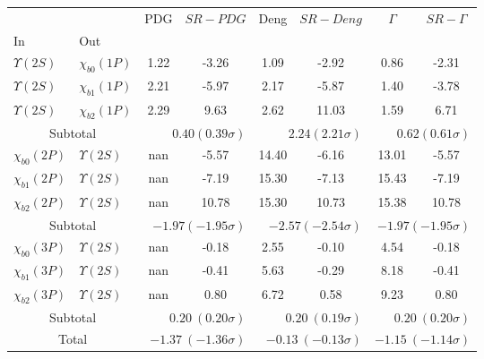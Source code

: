 \begin{tabular}{|l|l|c|c|c|c|c|c|}%
\hline%
&&PDG&$SR-PDG$&Deng&$SR-Deng$&$\Gamma$&$SR-\Gamma$\\%
In&Out&&&&&&\\%
\hline%
$\Upsilon(2S)$&$\chi_{b0}(1P)$&1.22&-3.26&1.09&-2.92&0.86&-2.31\\%
$\Upsilon(2S)$&$\chi_{b1}(1P)$&2.21&-5.97&2.17&-5.87&1.40&-3.78\\%
$\Upsilon(2S)$&$\chi_{b2}(1P)$&2.29&9.63&2.62&11.03&1.59&6.71\\%
\hline%
\hline%
\multicolumn{2}{|c|}{Subtotal}&\multicolumn{2}{|r|}{$0.40 (0.39\sigma)$}&\multicolumn{2}{|r|}{$2.24 (2.21\sigma)$}&\multicolumn{2}{|r|}{$0.62 (0.61\sigma)$}\\%
\hline%
\hline%
$\chi_{b0}(2P)$&$\Upsilon(2S)$&nan&-5.57&14.40&-6.16&13.01&-5.57\\%
$\chi_{b1}(2P)$&$\Upsilon(2S)$&nan&-7.19&15.30&-7.13&15.43&-7.19\\%
$\chi_{b2}(2P)$&$\Upsilon(2S)$&nan&10.78&15.30&10.73&15.38&10.78\\%
\hline%
\hline%
\multicolumn{2}{|c|}{Subtotal}&\multicolumn{2}{|r|}{$-1.97 (-1.95\sigma)$}&\multicolumn{2}{|r|}{$-2.57 (-2.54\sigma)$}&\multicolumn{2}{|r|}{$-1.97 (-1.95\sigma)$}\\%
\hline%
\hline%
$\chi_{b0}(3P)$&$\Upsilon(2S)$&nan&-0.18&2.55&-0.10&4.54&-0.18\\%
$\chi_{b1}(3P)$&$\Upsilon(2S)$&nan&-0.41&5.63&-0.29&8.18&-0.41\\%
$\chi_{b2}(3P)$&$\Upsilon(2S)$&nan&0.80&6.72&0.58&9.23&0.80\\%
\hline%
\hline%
\multicolumn{2}{|c|}{Subtotal}&\multicolumn{2}{|r|}{$0.20~(0.20\sigma)$}&\multicolumn{2}{|r|}{$0.20~(0.19\sigma)$}&\multicolumn{2}{|r|}{$0.20~(0.20\sigma)$}\\%
\hline%
\hline%
\multicolumn{2}{|c|}{Total}&\multicolumn{2}{|r|}{$-1.37~(-1.36\sigma)$}&\multicolumn{2}{|r|}{$-0.13~(-0.13\sigma)$}&\multicolumn{2}{|r|}{$-1.15~(-1.14\sigma)$}\\%
\hline%
\end{tabular}